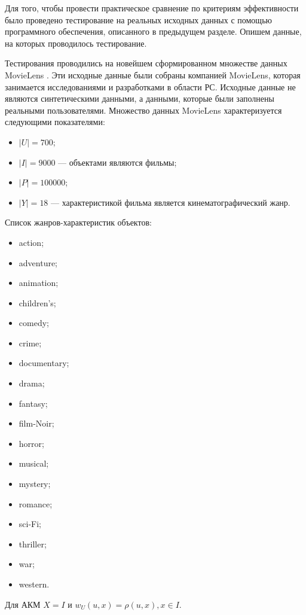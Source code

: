 Для того, чтобы провести практическое сравнение по критериям эффективности
было проведено тестирование на реальных исходных данных с помощью программного
обеспечения, описанного в предыдущем разделе. Опишем данные, на которых
проводилось тестирование.

Тестирования проводились на новейшем сформированном
множестве данных MovieLens \cite{ml-data}.
Эти исходные данные были собраны компанией MovieLens, которая
занимается исследованиями и разработками в области РС. Исходные
данные не являются синтетическими данными, а данными,
которые были заполнены реальными
пользователями. Множество данных MovieLens характеризуется следующими
показателями:
\begin{itemize}
	\item $|U| = 700$;
	\item $|I| = 9000$ --- объектами являются фильмы;
	\item $|P| = 100000$;
	\item $|Y| = 18$ --- характеристикой фильма является кинематографический
		жанр.
\end{itemize}
Список жанров-характеристик объектов:
\begin{itemize}
	\item action;
	\item adventure;
	\item animation;
	\item children's;
	\item comedy;
	\item crime;
	\item documentary;
	\item drama;
	\item fantasy;
	\item film-Noir;
	\item horror;
	\item musical;
	\item mystery;
	\item romance;
	\item sci-Fi;
	\item thriller;
	\item war;
	\item western.
\end{itemize}

Для АКМ $X = I$ и $w_U(u, x) = \rho(u,x), x \in I$.

